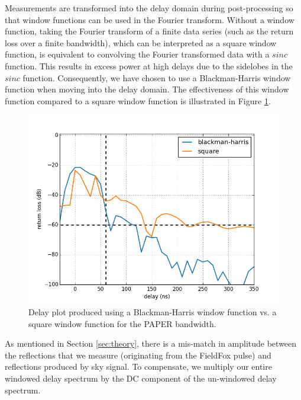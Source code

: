 \documentclass[12pt,preprint]{aastex}
\begin{document}
Measurements are transformed into the delay domain during post-processing so that window functions
can be used in the Fourier transform. Without a window function, taking the Fourier transform of a finite data series (such as the return loss over a finite bandwidth), which can be interpreted as a square window function, is equivalent to convolving the Fourier transformed data with a $sinc$ function. This results in excess power at high delays due to the sidelobes in the $sinc$ function. Consequently, we have chosen to use a Blackman-Harris window function when moving into the delay domain. The effectiveness of this window function compared to a square window function is illustrated in Figure \ref{fig:window}.

\begin{figure}
\centering
\includegraphics[totalheight=0.5\textheight]{plots/bh_vs_sq.png}
\caption{Delay plot produced using a Blackman-Harris window function vs. a square window function for the PAPER bandwidth.}
\label{fig:window}
\end{figure}

As mentioned in Section \ref{sec:theory}, there is a mis-match in amplitude between the reflections that we measure (originating from the FieldFox pulse) and reflections produced by sky signal. To compensate, we multiply our entire windowed delay spectrum by the DC component of the un-windowed delay spectrum.
\end{document}
